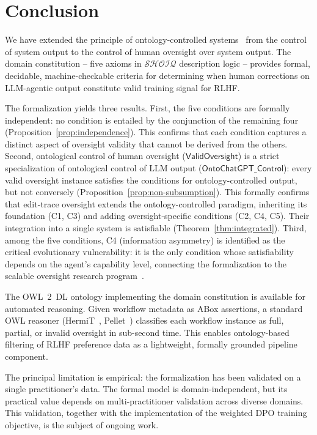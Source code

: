 \documentclass[11pt]{article}
\newcommand{\DL}{\ensuremath{\mathcal{SHOIQ}}\xspace}
\begin{document}
\section{Conclusion}
\label{sec:conclusion}

We have extended the principle of ontology-controlled systems~\citep{palagin2006architecture} from the control of system output to the control of human oversight over system output.
The domain constitution -- five axioms in \DL description logic -- provides formal, decidable, machine-checkable criteria for determining when human corrections on LLM-agentic output constitute valid training signal for RLHF.

The formalization yields three results.
First, the five conditions are formally independent: no condition is entailed by the conjunction of the remaining four (Proposition~\ref{prop:independence}).
This confirms that each condition captures a distinct aspect of oversight validity that cannot be derived from the others.
Second, ontological control of human oversight ($\mathsf{ValidOversight}$) is a strict specialization of ontological control of LLM output ($\mathsf{OntoChatGPT\_Control}$): every valid oversight instance satisfies the conditions for ontology-controlled output, but not conversely (Proposition~\ref{prop:non-subsumption}).
This formally confirms that edit-trace oversight extends the ontology-controlled paradigm, inheriting its foundation (C1, C3) and adding oversight-specific conditions (C2, C4, C5).
Their integration into a single system is satisfiable (Theorem~\ref{thm:integrated}).
Third, among the five conditions, C4 (information asymmetry) is identified as the critical evolutionary vulnerability: it is the only condition whose satisfiability depends on the agent's capability level, connecting the formalization to the scalable oversight research program~\citep{bowman2022measuring}.

The OWL~2~DL ontology implementing the domain constitution is available for automated reasoning.
Given workflow metadata as ABox assertions, a standard OWL reasoner (HermiT~\citep{glimm2014hermit}, Pellet~\citep{sirin2007pellet}) classifies each workflow instance as full, partial, or invalid oversight in sub-second time.
This enables ontology-based filtering of RLHF preference data as a lightweight, formally grounded pipeline component.

The principal limitation is empirical: the formalization has been validated on a single practitioner's data.
The formal model is domain-independent, but its practical value depends on multi-practitioner validation across diverse domains.
This validation, together with the implementation of the weighted DPO training objective, is the subject of ongoing work.




\end{document}

